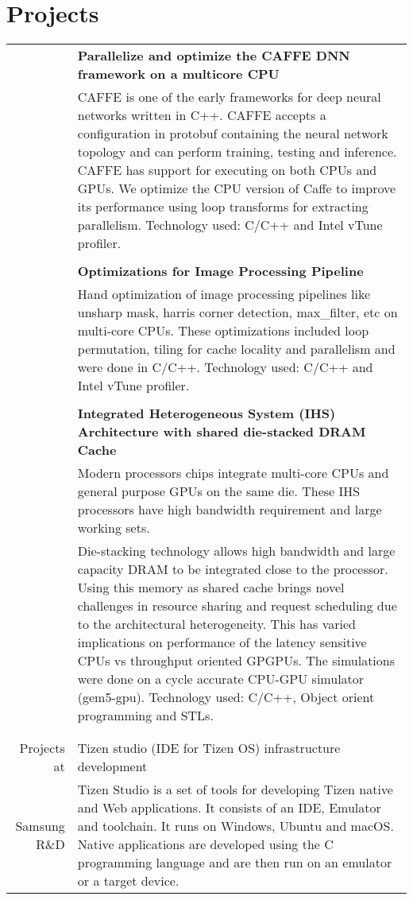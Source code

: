 \documentclass[a4paper,10pt]{article} %
\begin{document}
\section{Projects}
\begin{tabular}{rp{13cm}}
& \textbf{Parallelize and optimize the CAFFE DNN framework on a multicore CPU}\\
& \setlength{\leftskip}{0.4cm}
CAFFE is one of the early frameworks for deep neural networks written in C++. CAFFE accepts a configuration in protobuf containing the neural network topology and can perform training, testing and inference. CAFFE has support for executing  on both CPUs and GPUs. We optimize the CPU version of Caffe to improve its performance using loop transforms for extracting parallelism. Technology used: C/C++ and Intel vTune profiler.\\
& \\
& \textbf{Optimizations for Image Processing Pipeline} \\
& \setlength{\leftskip}{0.4cm}
Hand optimization of image processing pipelines like unsharp mask, harris corner detection, max\_filter, etc on multi-core CPUs. These optimizations included loop permutation, tiling for cache locality and parallelism and were done in C/C++. Technology used: C/C++ and Intel vTune profiler.\\
&\\
& \textbf{Integrated Heterogeneous System (IHS) Architecture with shared die-stacked DRAM Cache} \\
& \setlength{\leftskip}{0.4cm}
Modern processors chips integrate multi-core CPUs and general purpose GPUs on the same die. These IHS processors have high bandwidth requirement and large working sets.\\
& \setlength{\leftskip}{0.4cm} 
Die-stacking technology allows high bandwidth and large capacity DRAM to be
integrated close to the processor. Using this memory as shared cache brings
novel challenges in resource sharing and request scheduling due to the
architectural heterogeneity. This has varied implications on performance of the
latency sensitive CPUs vs throughput oriented GPGPUs. The simulations were done
on a cycle accurate CPU-GPU simulator (gem5-gpu). Technology used: C/C++, Object orient programming and STLs.\\
&\\
&\\
Projects at  &  Tizen studio (IDE for Tizen OS) infrastructure development \\
Samsung R\&D & Tizen Studio is a set of tools for developing Tizen native and Web applications. It consists of an IDE, Emulator and toolchain. It runs on Windows, Ubuntu and macOS. Native applications are developed using the C programming language and are then run on an emulator or a target device. \\

\end{tabular}
\end{document}
